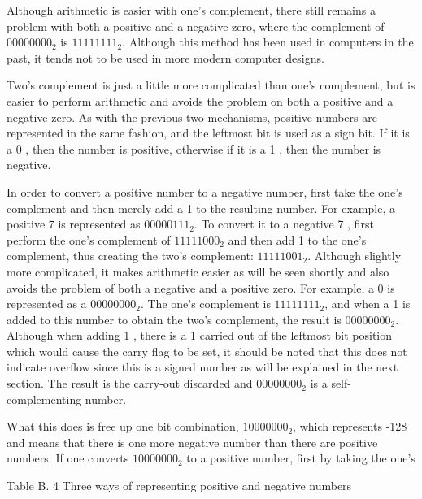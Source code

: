 \documentclass[10pt]{book}
\begin{document}
\begin{center}
\begin{center}
\begin{center}
\begin{center}
\begin{center}
Although arithmetic is easier with one's complement, there still remains a problem with both a positive and a negative zero, where the complement of $00000000_{2}$ is $11111111_{2}$. Although this method has been used in computers in the past, it tends not to be used in more modern computer designs.

Two's complement is just a little more complicated than one's complement, but is easier to perform arithmetic and avoids the problem on both a positive and a negative zero. As with the previous two mechanisms, positive numbers are represented in the same fashion, and the leftmost bit is used as a sign bit. If it is a 0 , then the number is positive, otherwise if it is a 1 , then the number is negative.

In order to convert a positive number to a negative number, first take the one's complement and then merely add a 1 to the resulting number. For example, a positive 7 is represented as $00000111_{2}$. To convert it to a negative 7 , first perform the one's complement of $11111000_{2}$ and then add 1 to the one's complement, thus creating the two's complement: $11111001_{2}$. Although slightly more complicated, it makes arithmetic easier as will be seen shortly and also avoids the problem of both a negative and a positive zero. For example, a 0 is represented as a $00000000_{2}$. The one's complement is $11111111_{2}$, and when a 1 is added to this number to obtain the two's complement, the result is $00000000_{2}$. Although when adding 1 , there is a 1 carried out of the leftmost bit position which would cause the carry flag to be set, it should be noted that this does not indicate overflow since this is a signed number as will be explained in the next section. The result is the carry-out discarded and $00000000_{2}$ is a self-complementing number.

What this does is free up one bit combination, $10000000_{2}$, which represents -128 and means that there is one more negative number than there are positive numbers. If one converts $10000000_{2}$ to a positive number, first by taking the one's

Table B. 4 Three ways of representing positive and negative numbers


\end{center}
\end{center}
\end{center}
\end{center}
\end{center}
\end{document}
